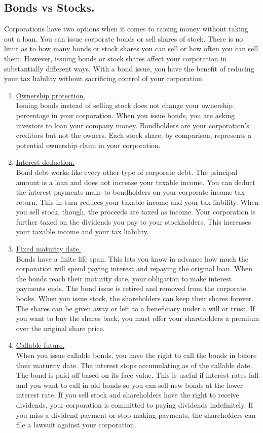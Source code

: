 \documentclass{book}
\begin{document}
\subsection{Bonds vs Stocks.}
Corporations have two options when it comes to raising money without taking out a loan. You can issue corporate bonds or sell shares of stock. There is no limit as to how many bonds or stock shares you can sell or how often you can sell them. However, issuing bonds or stock shares affect your corporation in substantially different ways. With a bond issue, you have the benefit of reducing your tax liability without sacrificing control of your corporation.
\begin{enumerate}
\item \underline{Ownership protection.}\\
Issuing bonds instead of selling stock does not change your ownership percentage in your corporation. When you issue bonds, you are asking investors to loan your company money. Bondholders are your corporation's creditors but not the owners. Each stock share, by comparison, represents a potential ownership claim in your corporation.
\item \underline{Interest deduction.}\\
Bond debt works like every other type of corporate debt. The principal amount is a loan and does not increase your taxable income. You can deduct the interest payments make to bondholders on your corporate income tax return. This in turn reduces your taxable income and your tax liability. When you sell stock, though, the proceeds are taxed as income. Your corporation is further taxed on the dividends you pay to your stockholders. This increases your taxable income and your tax liability.
\item \underline{Fixed maturity date.}\\
Bonds have a finite life span. This lets you know in advance how much the corporation will spend paying interest and repaying the original loan. When the bonds reach their maturity date, your obligation to make interest payments ends. The bond issue is retired and removed from the corporate books. When you issue stock, the shareholders can keep their shares forever. The shares can be given away or left to a beneficiary under a will or trust. If you want to buy the shares back, you must offer your shareholders a premium over the original share price.
\item \underline{Callable future.}\\
When you issue callable bonds, you have the right to call the bonds in before their maturity date. The interest stops accumulating as of the callable date. The bond is paid off based on its face value. This is useful if interest rates fall and you want to call in old bonds so you can sell new bonds at the lower interest rate. If you sell stock and shareholders have the right to receive dividends, your corporation is committed to paying dividends indefinitely. If you miss a dividend payment or stop making payments, the shareholders can file a lawsuit against your corporation.
\end{enumerate}
\end{document}
